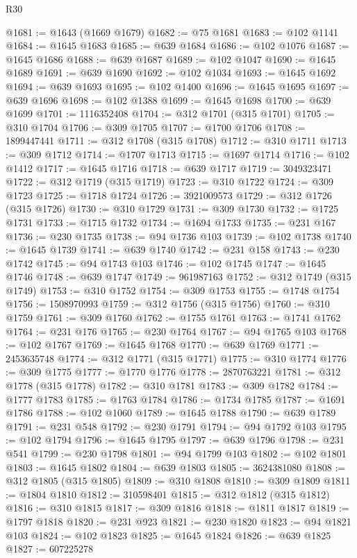 \begin{lexlean}{R30}
\begin{coremodule}
@1681 := @1643 (@1669 @1679)
@1682 := @75 @1681
@1683 := @102 @1141
@1684 := @1645 @1683
@1685 := @639 @1684
@1686 := @102 @1076
@1687 := @1645 @1686
@1688 := @639 @1687
@1689 := @102 @1047
@1690 := @1645 @1689
@1691 := @639 @1690
@1692 := @102 @1034
@1693 := @1645 @1692
@1694 := @639 @1693
@1695 := @102 @1400
@1696 := @1645 @1695
@1697 := @639 @1696
@1698 := @102 @1388
@1699 := @1645 @1698
@1700 := @639 @1699
@1701 := 1116352408
@1704 := @312 @1701 (@315 @1701)
@1705 := @310 @1704
@1706 := @309 @1705
@1707 := @1700 @1706
@1708 := 1899447441
@1711 := @312 @1708 (@315 @1708)
@1712 := @310 @1711
@1713 := @309 @1712
@1714 := @1707 @1713
@1715 := @1697 @1714
@1716 := @102 @1412
@1717 := @1645 @1716
@1718 := @639 @1717
@1719 := 3049323471
@1722 := @312 @1719 (@315 @1719)
@1723 := @310 @1722
@1724 := @309 @1723
@1725 := @1718 @1724
@1726 := 3921009573
@1729 := @312 @1726 (@315 @1726)
@1730 := @310 @1729
@1731 := @309 @1730
@1732 := @1725 @1731
@1733 := @1715 @1732
@1734 := @1694 @1733
@1735 := @231 @167
@1736 := @230 @1735
@1738 := @94 @1736 @103
@1739 := @102 @1738
@1740 := @1645 @1739
@1741 := @639 @1740
@1742 := @231 @158
@1743 := @230 @1742
@1745 := @94 @1743 @103
@1746 := @102 @1745
@1747 := @1645 @1746
@1748 := @639 @1747
@1749 := 961987163
@1752 := @312 @1749 (@315 @1749)
@1753 := @310 @1752
@1754 := @309 @1753
@1755 := @1748 @1754
@1756 := 1508970993
@1759 := @312 @1756 (@315 @1756)
@1760 := @310 @1759
@1761 := @309 @1760
@1762 := @1755 @1761
@1763 := @1741 @1762
@1764 := @231 @176
@1765 := @230 @1764
@1767 := @94 @1765 @103
@1768 := @102 @1767
@1769 := @1645 @1768
@1770 := @639 @1769
@1771 := 2453635748
@1774 := @312 @1771 (@315 @1771)
@1775 := @310 @1774
@1776 := @309 @1775
@1777 := @1770 @1776
@1778 := 2870763221
@1781 := @312 @1778 (@315 @1778)
@1782 := @310 @1781
@1783 := @309 @1782
@1784 := @1777 @1783
@1785 := @1763 @1784
@1786 := @1734 @1785
@1787 := @1691 @1786
@1788 := @102 @1060
@1789 := @1645 @1788
@1790 := @639 @1789
@1791 := @231 @548
@1792 := @230 @1791
@1794 := @94 @1792 @103
@1795 := @102 @1794
@1796 := @1645 @1795
@1797 := @639 @1796
@1798 := @231 @541
@1799 := @230 @1798
@1801 := @94 @1799 @103
@1802 := @102 @1801
@1803 := @1645 @1802
@1804 := @639 @1803
@1805 := 3624381080
@1808 := @312 @1805 (@315 @1805)
@1809 := @310 @1808
@1810 := @309 @1809
@1811 := @1804 @1810
@1812 := 310598401
@1815 := @312 @1812 (@315 @1812)
@1816 := @310 @1815
@1817 := @309 @1816
@1818 := @1811 @1817
@1819 := @1797 @1818
@1820 := @231 @923
@1821 := @230 @1820
@1823 := @94 @1821 @103
@1824 := @102 @1823
@1825 := @1645 @1824
@1826 := @639 @1825
@1827 := 607225278

\end{coremodule}
\end{lexlean}
